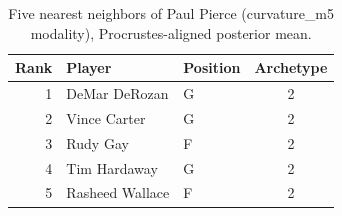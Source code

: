 \begin{table}[htbp]
  \centering\small
  \begin{tabular}{rllc}
    \toprule
    Rank & Player & Position & Archetype \\
    \midrule
    1 & DeMar DeRozan & G & 2 \\
    2 & Vince Carter & G & 2 \\
    3 & Rudy Gay & F & 2 \\
    4 & Tim Hardaway & G & 2 \\
    5 & Rasheed Wallace & F & 2 \\
    \bottomrule
  \end{tabular}
  \caption{Five nearest neighbors of Paul Pierce (curvature_m5 modality), Procrustes-aligned posterior mean.}
  \label{tab:Paul_Pierce_neighbors_curvature_m5}
\end{table}

